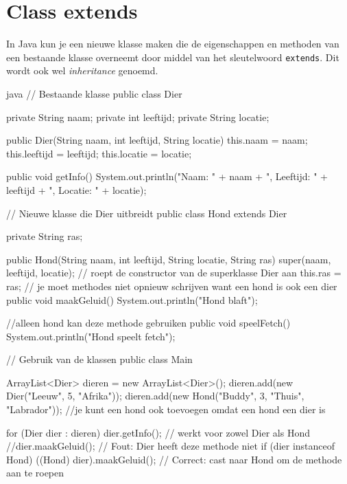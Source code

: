 \documentclass[a4paper,11pt]{article}
\begin{document}
\section{Class extends}
In Java kun je een nieuwe klasse maken die de eigenschappen en methoden van een bestaande klasse overneemt door middel van het sleutelwoord \texttt{extends}. Dit wordt ook wel \textit{inheritance} genoemd.

\begin{codeblock}{java}
    // Bestaande klasse
    public class Dier {

    private String naam;
    private int leeftijd;
    private String locatie;

    public Dier(String naam, int leeftijd, String locatie) {
        this.naam = naam;
        this.leeftijd = leeftijd;
        this.locatie = locatie;
        }

        public void getInfo() {
            System.out.println("Naam: " + naam + ", Leeftijd: " + leeftijd + ", Locatie: " + locatie);
        }
    }

    // Nieuwe klasse die Dier uitbreidt
    public class Hond extends Dier {

        private String ras;

        public Hond(String naam, int leeftijd, String locatie, String ras) {
            super(naam, leeftijd, locatie); // roept de constructor van de superklasse Dier aan
            this.ras = ras;
        }
        // je moet methodes niet opnieuw schrijven want een hond is ook een dier
        public void maakGeluid() {
            System.out.println("Hond blaft");
        }

        //alleen hond kan deze methode gebruiken
        public void speelFetch() {
            System.out.println("Hond speelt fetch");
        }
    }

    // Gebruik van de klassen
    public class Main {
        ArrayList<Dier> dieren = new ArrayList<Dier>();
        dieren.add(new Dier("Leeuw", 5, "Afrika"));
        dieren.add(new Hond("Buddy", 3, "Thuis", "Labrador"));
        //je kunt een hond ook toevoegen omdat een hond een dier is

        for (Dier dier : dieren) {
            dier.getInfo(); // werkt voor zowel Dier als Hond
            //dier.maakGeluid(); // Fout: Dier heeft deze methode niet
            if (dier instanceof Hond) {
                ((Hond) dier).maakGeluid(); // Correct: cast naar Hond om de methode aan te roepen
            }
        }
    }



\end{codeblock}
\end{document}
